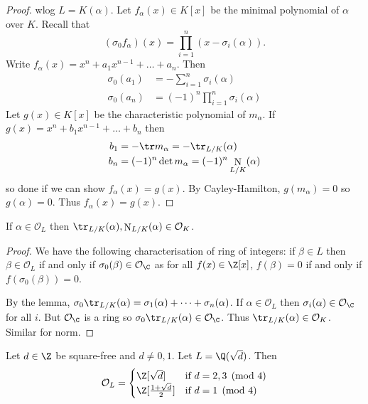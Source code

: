 \documentclass[a4paper]{article}
\renewcommand*{\O}{\mathcal{O}}
\DeclareMathOperator{\n}{N}
\begin{document}
\begin{proof}
  wlog \(L = K(\alpha)\). Let \(f_\alpha(x) \in K[x]\) be the minimal polynomial of \(\alpha\) over \(K\). Recall that
  \[
    (\sigma_0f_\alpha)(x) = \prod_{i = 1}^n (x - \sigma_i(\alpha)).
  \]
  Write \(f_\alpha(x) = x^n + a_1x^{n - 1} + \dots + a_n\). Then
  \begin{align*}
    \sigma_0(a_1) &= - \sum_{i = 1}^n \sigma_i(\alpha) \\
    \sigma_0(a_n) &= (-1)^n \prod_{i = 1}^n \sigma_i(\alpha)
  \end{align*}
  Let \(g(x) \in K[x]\) be the characteristic polynomial of \(m_\alpha\). If \(g(x) = x^n + b_1x^{n - 1} + \dots + b_n\) then
  \begin{align*}
    b_1 &= -\tr m_\alpha = -\tr_{L/K}(\alpha) \\
    b_n &= (-1)^n\det m_\alpha = (-1)^n \n_{L/K}(\alpha)
  \end{align*}
  so done if we can show \(f_\alpha(x) = g(x)\). By Cayley-Hamilton, \(g(m_\alpha) = 0\) so \(g(\alpha) = 0\). Thus \(f_\alpha(x) = g(x)\).
\end{proof}

\begin{corollary}
  If \(\alpha \in \O_L\) then \(\tr_{L/K}(\alpha), \n_{L/K}(\alpha) \in \O_K\).
\end{corollary}

\begin{proof}
  We have the following characterisation of ring of integers: if \(\beta \in L\) then \(\beta \in \O_L\) if and only if \(\sigma_0(\beta) \in \O_\C\) as for all \(f(x) \in \Z[x]\), \(f(\beta) = 0\) if and only if \(f(\sigma_0(\beta)) = 0\).

  By the lemma, \(\sigma_0 \tr_{L/K}(\alpha) = \sigma_1(\alpha) + \dots + \sigma_n(\alpha)\). If \(\alpha \in \O_L\) then \(\sigma_i(\alpha) \in \O_\C\) for all \(i\). But \(\O_\C\) is a ring so \(\sigma_0 \tr_{L/K}(\alpha) \in \O_\C\). Thus \(\tr_{L/K}(\alpha) \in \O_K\). Similar for norm.
\end{proof}

\begin{proposition}
  Let \(d \in \Z\) be square-free and \(d \neq 0, 1\). Let \(L = \Q(\sqrt d)\). Then
  \[
    \O_L =
    \begin{cases}
      \Z[\sqrt d] & \text{if } d = 2, 3 \pmod 4 \\
      \Z[\frac{1 + \sqrt d}{2}] & \text{if } d = 1 \pmod 4
    \end{cases}
  \]
\end{proposition}
\end{document}
